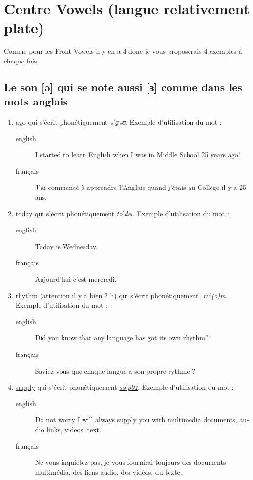 \section{Centre Vowels (langue relativement plate)}
\label{sec:org05de138}
Comme pour les Front Vowels il y en a 4 donc je vous proposerais 4
exemples à chaque fois.
\subsection{Le son [ə] qui se note aussi [ɜ] comme dans les mots anglais}
\label{sec:org909cc21}
\begin{enumerate}
\item \href{http://www.wordreference.com/enfr/ago}{ago} qui s'écrit phonétiquement \href{https://en.oxforddictionaries.com/definition/ago}{\emph{əˈɡəʊ}}. Exemple d'utilisation du mot :
\begin{description}
\item[{english}] \textenglish{I started to learn English when I was in Middle School
25 years \href{https://youtu.be/RO4fWbM3WA8}{ago}!}
\item[{français}] J'ai commencé à apprendre l'Anglais quand j'étais au
Collège il y a 25 ans.
\end{description}
\item \href{http://www.wordreference.com/enfr/today}{today} qui s'écrit phonétiquement \href{https://en.oxforddictionaries.com/definition/today}{\emph{təˈdeɪ}}. Exemple d'utilisation du mot :
\begin{description}
\item[{english}] \textenglish{\href{https://youtu.be/yCSLK0WCUd8}{Today} is Wednesday.}
\item[{français}] Aujourd'hui c'est mercredi.
\end{description}
\item \href{http://www.wordreference.com/enfr/rhythm}{rhythm} (attention il y a bien 2 h) qui s'écrit phonétiquement
\href{https://en.oxforddictionaries.com/definition/rhythm}{\emph{ˈrɪð(ə)m}}. Exemple d'utilisation du mot :
\begin{description}
\item[{english}] \textenglish{Did you know that any language has got its own \href{https://youtu.be/XQJVoS3SlX0}{rhythm}?}
\item[{français}] Saviez-vous que chaque langue a son propre rythme ?
\end{description}
\item \href{http://www.wordreference.com/enfr/supply}{supply} qui s'écrit phonétiquement \href{https://en.oxforddictionaries.com/definition/supply}{\emph{səˈplʌɪ}}. Exemple d'utilisation du mot : 
\begin{description}
\item[{english}] \textenglish{Do not worry I will always \href{https://youtu.be/qEd6QUbK2Mw}{supply} you with multimedia
documents, audio links, videos, text.}
\item[{français}] Ne vous inquiétez pas, je vous fournirai toujours des
documents multimédia, des liens audio, des vidéos, du texte.
\end{description}
\end{enumerate}

